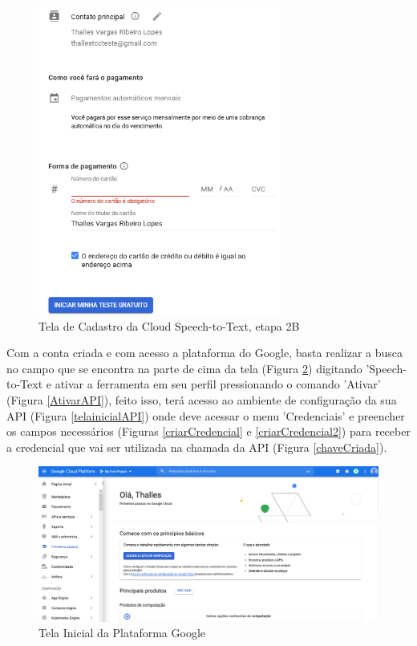 \begin{figure}[h!]
\centering
\caption{Tela de Cadastro da Cloud Speech-to-Text, etapa 2B}
\label{CloudCadastro2b}
\includegraphics[width=80mm]{images/ConfigurarGoogle/cadastroetapa02b.PNG}
\end{figure}
\FloatBarrier


Com a conta criada e com acesso a plataforma do Google, basta realizar a busca no campo que se encontra na parte de cima da tela (Figura \ref{plataformaGoogle}) digitando 'Speech-to-Text e ativar a ferramenta em seu perfil pressionando o comando 'Ativar' (Figura \ref{AtivarAPI}), feito isso, terá acesso ao ambiente de configuração da sua API (Figura \ref{telainicialAPI}) onde deve acessar o menu 'Credenciais' e preencher os campos necessários (Figuras \ref{criarCredencial} e \ref{criarCredencial2}) para receber a credencial que vai ser utilizada na chamada da API (Figura \ref{chaveCriada}).

\begin{figure}[h!]
\centering
\caption{Tela Inicial da Plataforma Google}
\label{plataformaGoogle}
\includegraphics[width=150mm]{images/ConfigurarGoogle/telainicial.PNG}
\end{figure}


